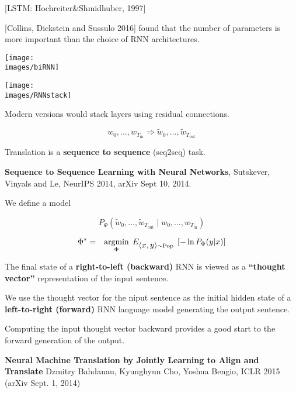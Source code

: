 {\vfill
\centerline{[LSTM: Hochreiter\&Shmidhuber, 1997]}


[Collins, Dickstein and Sussulo 2016] found that the number of parameters is more important than the choice of RNN architectures.


\centerline{\texttt{[image: \\images/biRNN]}}


\centerline{\texttt{[image: \\images/RNNstack]}}

Modern versions would stack layers using residual connections.


$$w_0,\ldots,w_{T_{\mathrm{in}}} \Rightarrow \tilde{w}_0,\ldots,\tilde{w}_{T_{\mathrm{out}}}$$

\vfill
Translation is a {\bf sequence to sequence} (seq2seq) task.

\vfill
{\bf Sequence to Sequence Learning with Neural Networks}, Sutskever, Vinyals and Le, NeurIPS 2014, arXiv Sept 10, 2014.


\vfill
We define a model

\vfill
$$P_\Phi\left(\tilde{w}_0,\ldots,\tilde{w}_{T_{\mathrm{out}}}\;|\; w_0,\ldots,w_{T_{\mathrm{in}}}\right)$$

\vfill
\begin{eqnarray*}
\Phi^*  & = & \operatorname*{argmin}_\Phi \; E_{{\mbox{$\langle x,y\rangle$}} \sim \mathrm{Pop}} \; \left[-\ln P_\Phi(y|x)\right]
\end{eqnarray*}


\vfill
The final state of a {\bf right-to-left (backward)} RNN is viewed as a {\bf ``thought vector''} representation of the input sentence.

\vfill
We use the thought vector for the niput sentence as the initial hidden state of a {\bf left-to-right (forward)} RNN language model
generating the output sentence.

\vfill
Computing the input thought vector backward provides a good start to the forward generation of the output.


{\bf Neural Machine Translation by Jointly Learning to {\color{red} Align} and Translate}
Dzmitry Bahdanau, Kyunghyun Cho, Yoshua Bengio, ICLR 2015 (arXiv Sept. 1, 2014)

}
